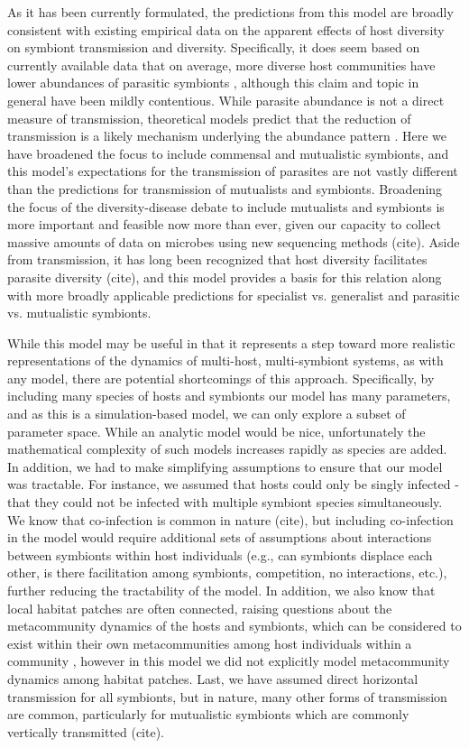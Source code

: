 \documentclass[12pt]{article}
\begin{document}
As it has been currently formulated, the predictions from this model are broadly consistent with existing empirical data on the apparent effects of host diversity on symbiont transmission and diversity.
Specifically, it does seem based on currently available data that on average, more diverse host communities have lower abundances of parasitic symbionts \citep{Civitello2015}, although this claim and topic in general have been mildly contentious. 
While parasite abundance is not a direct measure of transmission, theoretical models predict that the reduction of transmission is a likely mechanism underlying the abundance pattern \citep{Dobson2004a, Rudolf2005, Mihaljevic2014}.
Here we have broadened the focus to include commensal and mutualistic symbionts, and this model's expectations for the transmission of parasites are not vastly different than the predictions for transmission of mutualists and symbionts. 
Broadening the focus of the diversity-disease debate to include mutualists and symbionts is more important and feasible now more than ever, given our capacity to collect massive amounts of data on microbes using new sequencing methods (cite). 
Aside from transmission, it has long been recognized that host diversity facilitates parasite diversity (cite), and this model provides a basis for this relation along with more broadly applicable predictions for specialist vs. generalist and parasitic vs. mutualistic symbionts. 

While this model may be useful in that it represents a step toward more realistic representations of the dynamics of multi-host, multi-symbiont systems, as with any model, there are potential shortcomings of this approach. 
Specifically, by including many species of hosts and symbionts our model has many parameters, and as this is a simulation-based model, we can only explore a subset of parameter space. 
While an analytic model would be nice, unfortunately the mathematical complexity of such models increases rapidly as species are added. 
In addition, we had to make simplifying assumptions to ensure that our model was tractable. 
For instance, we assumed that hosts could only be singly infected - that they could not be infected with multiple symbiont species simultaneously. 
We know that co-infection is common in nature (cite), but including co-infection in the model would require additional sets of assumptions about interactions between symbionts within host individuals (e.g., can symbionts displace each other, is there facilitation among symbionts, competition, no interactions, etc.), further reducing the tractability of the model. 
In addition, we also know that local habitat patches are often connected, raising questions about the metacommunity dynamics of the hosts and symbionts, which can be considered to exist within their own metacommunities among host individuals within a community \citep{Mihaljevic2012}, however in this model we did not explicitly model metacommunity dynamics among habitat patches.
Last, we have assumed direct horizontal transmission for all symbionts, but in nature, many other forms of transmission are common, particularly for mutualistic symbionts which are commonly vertically transmitted (cite). 
\end{document}
